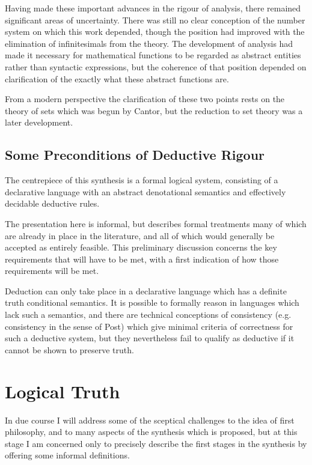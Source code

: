 \documentclass[10pt,titlepage]{book}
\begin{document}
Having made these important advances in the rigour of analysis, there remained significant areas of uncertainty.
There was still no clear conception of the number system on which this work depended, though the position had improved with the elimination of infinitesimals from the theory.
The development of analysis had made it necessary for mathematical functions to be regarded as abstract entities rather than syntactic expressions, but the coherence of that position depended on clarification of the exactly what these abstract functions are.

From a modern perspective the clarification of these two points rests on the theory of sets which was begun by Cantor, but the reduction to set theory was a later development.

\section{Some Preconditions of Deductive Rigour}

The centrepiece of this synthesis is a formal logical system, consisting of a declarative language with an abstract denotational semantics and effectively decidable deductive rules.

The presentation here is informal, but describes formal treatments many of which are already in place in the literature, and all of which would generally be accepted as entirely feasible.
This preliminary discussion concerns the key requirements that will have to be met, with a first indication of how those requirements will be met.

Deduction can only take place in a declarative language which has a definite truth conditional semantics.
It is possible to formally reason in languages which lack such a semantics, and there are technical conceptions of consistency (e.g. consistency in the sense of Post) which give minimal criteria of correctness for such a deductive system, but they nevertheless fail to qualify as deductive if it cannot be shown to preserve truth.




\chapter{Logical Truth}

In due course I will address some of the sceptical challenges to the idea of first philosophy, and to many aspects of the synthesis which is proposed, but at this stage I am concerned only to precisely describe the first stages in the synthesis by offering some informal definitions.
\end{document}
